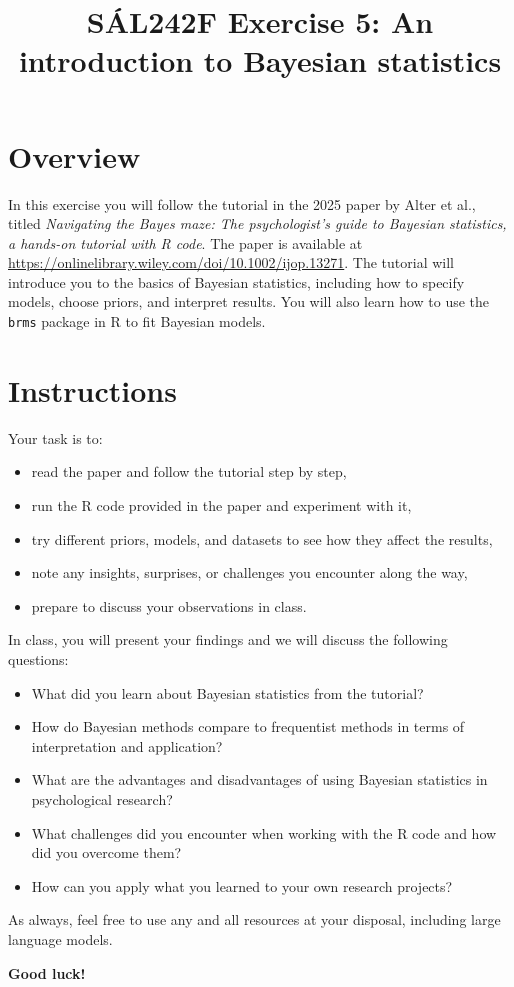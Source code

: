\documentclass[11pt]{article}
\title{SÁL242F Exercise 5: An introduction to Bayesian statistics}
\author{}
\date{}
\begin{document}
\maketitle

\section*{Overview}

In this exercise you will follow the tutorial in the 2025 paper by Alter et al., titled \textit{Navigating the Bayes maze: The psychologist’s guide to
Bayesian statistics, a hands-on tutorial with R code}. The paper is available at \url{https://onlinelibrary.wiley.com/doi/10.1002/ijop.13271}. The tutorial will introduce you to the basics of Bayesian statistics, including how to specify models, choose priors, and interpret results. You will also learn how to use the \texttt{brms} package in R to fit Bayesian models.

\section*{Instructions}

\noindent
Your task is to:
\begin{itemize}
    \item read the paper and follow the tutorial step by step,
    \item run the R code provided in the paper and experiment with it,
    \item try different priors, models, and datasets to see how they affect the results,
    \item note any insights, surprises, or challenges you encounter along the way,
    \item prepare to discuss your observations in class.
\end{itemize}

\noindent
In class, you will present your findings and we will discuss the following questions:
\begin{itemize}
    \item What did you learn about Bayesian statistics from the tutorial?
    \item How do Bayesian methods compare to frequentist methods in terms of interpretation and application?
    \item What are the advantages and disadvantages of using Bayesian statistics in psychological research?
    \item What challenges did you encounter when working with the R code and how did you overcome them?
    \item How can you apply what you learned to your own research projects?
\end{itemize}

\noindent
As always, feel free to use any and all resources at your disposal, including large language models.

\noindent\textbf{Good luck!}
\end{document}

